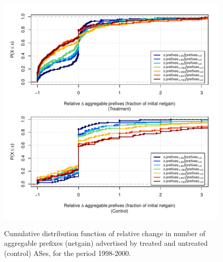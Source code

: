 \begin{figure}[H]
\begin{centering}
\begin{singlespace}
\captionsetup{list=no}
    \includegraphics[width=6in]{figures/behavior-rel_netgain-1998_2000-corr.pdf}
    \vspace{-2em}\\
    \caption{Cumulative distribution function of relative change in number of
    aggregable prefixes (netgain) advertised by treated and untreated (control)
    ASes, for the period 1998-2000.}
\end{singlespace}
\end{centering}
\end{figure}

